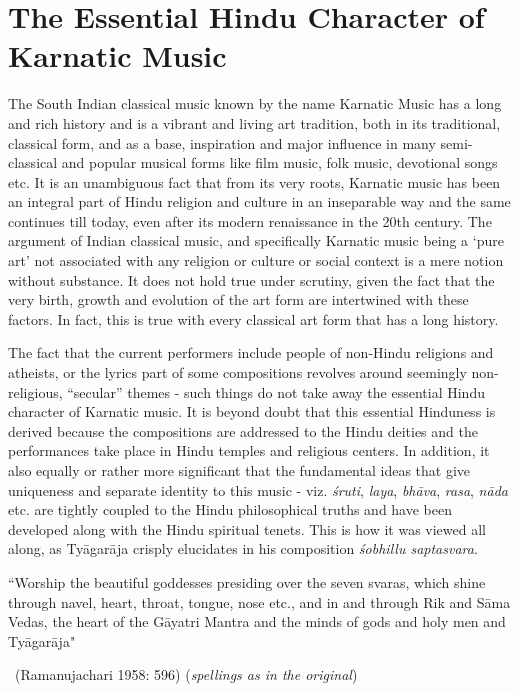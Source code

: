 \vspace{-.3cm}

\section*{The Essential Hindu Character of Karnatic Music}

The South Indian classical music known by the name Karnatic Music has a long and rich history and is a vibrant and living art tradition, both in its traditional, classical form, and as a base, inspiration and major influence in many semi-classical and popular musical forms like film music, folk music, devotional songs etc. It is an unambiguous fact that from its very roots, Karnatic music has been an integral part of Hindu religion and culture in an inseparable way and the same continues till today, even after its modern renaissance in the 20th century. The argument of Indian classical music, and specifically Karnatic music being a `pure art' not associated with any religion or culture or social context is a mere notion without substance. It does not hold true under scrutiny, given the fact that the very birth, growth and evolution of the art form are intertwined with these factors. In fact, this is true with every classical art form that has a long history.

The fact that the current performers include people of non-Hindu religions and atheists, or the lyrics part of some compositions revolves around seemingly non-religious, ``secular'' themes - such things do not take away the essential Hindu character of Karnatic music. It is beyond doubt that this essential Hinduness is derived because the compositions are addressed to the Hindu deities and the performances take place in Hindu temples and religious centers. In addition, it also equally or rather more significant that the fundamental ideas that give uniqueness and separate identity to this music - viz. \textit{śruti}, \textit{laya}, \textit{bhāva}, \textit{rasa}, \textit{nāda} etc. are tightly coupled to the Hindu philosophical truths and have been developed along with the Hindu spiritual tenets. This is how it was viewed all along, as Tyāgarāja crisply elucidates in his composition \textit{śobhillu saptasvara}.

\begin{myquote}
``Worship the beautiful goddesses presiding over the seven svaras, which shine through navel, heart, throat, tongue, nose etc., and in and through Rik and Sāma Vedas, the heart of the Gāyatri Mantra and the minds of gods and holy men and Tyāgarāja" 

~\hfill (Ramanujachari 1958: 596) (\textit{spellings as in the original})
\end{myquote}

